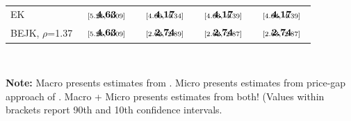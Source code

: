 \documentclass[pdftex,12pt]{article}
\begin{document}
\begin{table}[!t]
\begin{center}
\begin{tabular}[t]{l c c c c}
EK              & $\begin{array}{c}{\textbf{4.63}} \vspace{-.4cm}\\ \scriptstyle{[5.21,   \ 4.09]}\end{array}$  & $\begin{array}{c}{\textbf{4.17}} \vspace{-.4cm}\\ \scriptstyle{[4.00,   \ 4.34]}\end{array}$  & $\begin{array}{c}{\textbf{4.17}} \vspace{-.4cm}\\ \scriptstyle{[4.03,   \ 4.39]}\end{array}$   & $\begin{array}{c}{\textbf{4.17}} \vspace{-.4cm}\\ \scriptstyle{[4.04,   \ 4.39]}\end{array}$      \\
BEJK, $\rho$=1.37            & $\begin{array}{c}{\textbf{4.63}} \vspace{-.4cm}\\ \scriptstyle{[5.21,   \ 4.09]}\end{array}$    &  $\begin{array}{c}{\textbf{2.74}} \vspace{-.4cm}\\ \scriptstyle{[2.62,   \ 2.89]}\end{array}$  & $\begin{array}{c}{\textbf{2.74}} \vspace{-.4cm}\\ \scriptstyle{[2.62,   \ 2.87]}\end{array}$           & $\begin{array}{c}{\textbf{2.74}} \vspace{-.4cm}\\ \scriptstyle{[2.63,   \ 2.87]}\end{array}$ \\
\hline
\end{tabular}
\\[0.75ex]
\parbox{5.1in}{\footnotesize \textbf{Note:} Macro presents estimates from \citet{caliendo2014estimates}. Micro presents estimates from price-gap approach of \citet{simonovska2014trade}. Macro + Micro presents estimates from both! (Values within brackets report 90th and 10th confidence intervals. }
\end{center}
\end{table}
\end{document}
